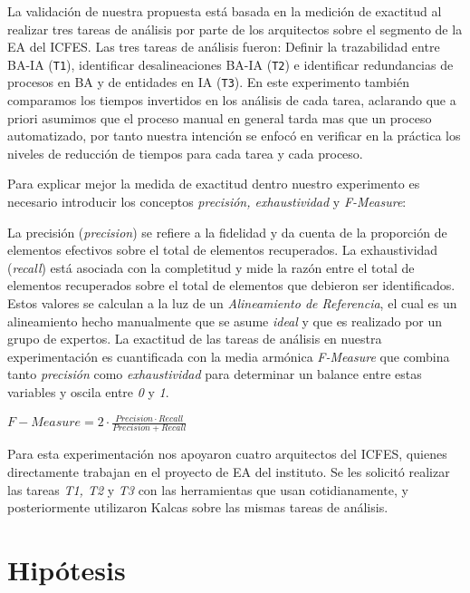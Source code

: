 La validaci\'on de nuestra propuesta est\'a basada en la medici\'on de exactitud al realizar tres tareas de an\'alisis por parte de los arquitectos sobre el segmento de la EA del ICFES. Las tres tareas de an\'alisis fueron: Definir la trazabilidad entre BA-IA (\texttt{T1}), identificar desalineaciones BA-IA (\texttt{T2}) e identificar redundancias de procesos en BA y de entidades en IA (\texttt{T3}). En este experimento tambi\'en comparamos los tiempos invertidos en los an\'alisis de cada tarea, aclarando que a priori asumimos que el proceso manual en general tarda mas que un proceso automatizado, por tanto nuestra intenci\'on se enfoc\'o en verificar en la pr\'actica los niveles de reducci\'on de tiempos para cada tarea y cada proceso.

Para explicar mejor la medida de exactitud dentro nuestro experimento es necesario introducir los conceptos \textit{precisi\'on, exhaustividad} y \textit{F-Measure}:

La precisi\'on (\textit{precision}) se refiere a la fidelidad y da cuenta de la proporci\'on de elementos efectivos sobre el total de elementos recuperados. La exhaustividad (\textit{recall}) est\'a asociada con la completitud y mide la raz\'on entre el total de elementos recuperados sobre el total de elementos que debieron ser identificados. Estos valores se calculan a la luz de un \textit{Alineamiento de Referencia}, el cual es un alineamiento hecho manualmente que se asume \textit{ideal} y que es realizado por un grupo de expertos. La exactitud de las tareas de an\'alisis en nuestra experimentaci\'on es cuantificada con la media arm\'onica \textit{F-Measure} que combina tanto \textit{precisi\'on} como \textit{exhaustividad} para determinar un balance entre estas variables y oscila entre \textit{0} y \textit{1}.

\begin{center}
	\begin{math}
	F-Measure = 2 \cdot{\frac{Precision\cdot{Recall}}{Precision+Recall}}
	\end{math}
\end{center}

Para esta experimentaci\'on nos apoyaron cuatro arquitectos del ICFES, quienes directamente trabajan en el proyecto de EA del instituto. Se les solicit\'o realizar las tareas \textit{T1, T2} y \textit{T3} con las herramientas que usan cotidianamente, y posteriormente utilizaron Kalcas sobre las mismas tareas de an\'alisis.

\section{Hip\'otesis} \label{sec:hypothesis}

